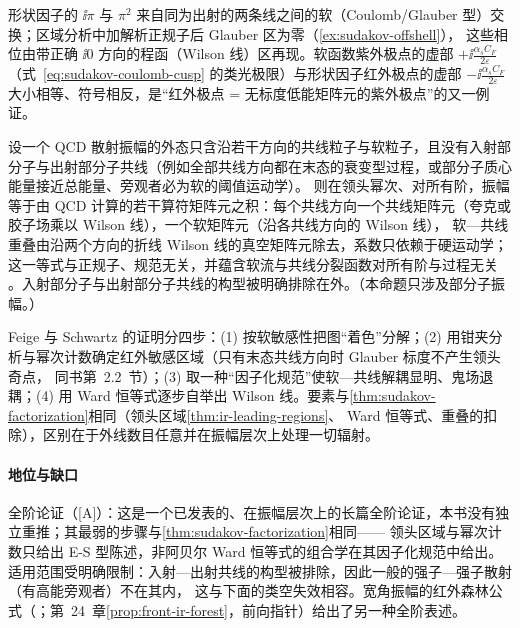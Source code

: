 形状因子的 $\ii\pi$ 与 $\pi^2$ 来自同为出射的两条线之间的软（Coulomb/Glauber 型）交换；区域分析中加解析正规子后 Glauber 区为零（\cref{ex:sudakov-offshell}），
这些相位由带正确 $\ii0$ 方向的程函（Wilson 线）区再现。软函数紫外极点的虚部 $+\ii\frac{\alpha_sC_F}{2\varepsilon}$（式~\eqref{eq:sudakov-coulomb-cusp} 的类光极限）与形状因子红外极点的虚部
$-\ii\frac{\alpha_sC_F}{2\varepsilon}$ 大小相等、符号相反，是“红外极点 = 无标度低能矩阵元的紫外极点”的又一例证。%

\begin{proposition}\label{prop:sudakov-amplitude-factorization}
设一个 QCD 散射振幅的外态只含沿若干方向的共线粒子与软粒子，且没有入射部分子与出射部分子共线（例如全部共线方向都在末态的衰变型过程，或部分子质心能量接近总能量、旁观者必为软的阈值运动学）。
则在领头幂次、对所有阶，振幅等于由 QCD 计算的若干算符矩阵元之积：每个共线方向一个共线矩阵元（夸克或胶子场乘以 Wilson 线），一个软矩阵元（沿各共线方向的 Wilson 线），
软—共线重叠由沿两个方向的折线 Wilson 线的真空矩阵元除去，系数只依赖于硬运动学；这一等式与正规子、规范无关，并蕴含软流与共线分裂函数对所有阶与过程无关
\cite{FeigeSchwartz2014,Feige:2013zla}。入射部分子与出射部分子共线的构型被明确排除在外\cite[第~2.2、10、11.2~节]{FeigeSchwartz2014}。（本命题只涉及部分子振幅。）
\end{proposition}

\begin{proofsketch}
Feige 与 Schwartz 的证明分四步\cite[第~5--9~节]{FeigeSchwartz2014}：(1) 按软敏感性把图“着色”分解；(2) 用钳夹分析与幂次计数确定红外敏感区域（只有末态共线方向时 Glauber 标度不产生领头奇点，
同书第~2.2~节）；(3) 取一种“因子化规范”使软—共线解耦显明、鬼场退耦；(4) 用 Ward 恒等式逐步自举出 Wilson 线。要素与\cref{thm:sudakov-factorization}相同（领头区域\cref{thm:ir-leading-regions}、
Ward 恒等式、重叠的扣除），区别在于外线数目任意并在振幅层次上处理一切辐射。
\end{proofsketch}

\paragraph{地位与缺口}全阶论证（[A]）：这是一个已发表的、在振幅层次上的长篇全阶论证，本书没有独立重推；其最弱的步骤与\cref{thm:sudakov-factorization}相同——
领头区域与幂次计数只给出 E-S 型陈述，非阿贝尔 Ward 恒等式的组合学在其因子化规范中给出。适用范围受明确限制：入射—出射共线的构型被排除，因此一般的强子—强子散射（有高能旁观者）不在其内，
这与下面的类空失效相容。宽角振幅的红外森林公式（\cite{Ma2020}；第~24~章\cref{prop:front-ir-forest}，前向指针）给出了另一种全阶表述。

